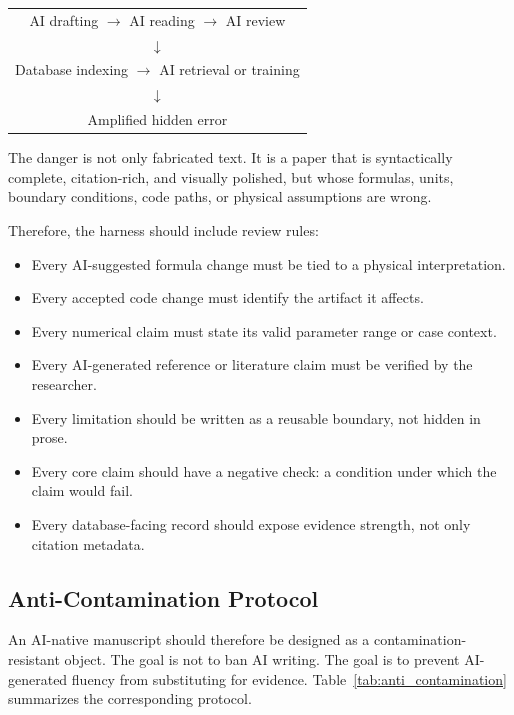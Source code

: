 \documentclass{article}
\begin{document}
\begin{tcolorbox}[colback=red!3!white,colframe=red!65!black,title=AI-to-AI Contamination Loop,arc=4mm,boxrule=1pt]
\small
\begin{center}
\begin{tabular}{c}
AI drafting $\rightarrow$ AI reading $\rightarrow$ AI review \\
$\downarrow$ \\
Database indexing $\rightarrow$ AI retrieval or training \\
$\downarrow$ \\
Amplified hidden error
\end{tabular}
\end{center}
The danger is not only fabricated text. It is a paper that is syntactically complete, citation-rich, and visually polished, but whose formulas, units, boundary conditions, code paths, or physical assumptions are wrong.
\end{tcolorbox}

Therefore, the harness should include review rules:

\begin{itemize}
    \item Every AI-suggested formula change must be tied to a physical interpretation.
    \item Every accepted code change must identify the artifact it affects.
    \item Every numerical claim must state its valid parameter range or case context.
    \item Every AI-generated reference or literature claim must be verified by the researcher.
    \item Every limitation should be written as a reusable boundary, not hidden in prose.
    \item Every core claim should have a negative check: a condition under which the claim would fail.
    \item Every database-facing record should expose evidence strength, not only citation metadata.
\end{itemize}

\subsection{Anti-Contamination Protocol}
\label{sec:contamination}

An AI-native manuscript should therefore be designed as a contamination-resistant object. The goal is not to ban AI writing. The goal is to prevent AI-generated fluency from substituting for evidence. Table~\ref{tab:anti_contamination} summarizes the corresponding protocol.
\end{document}
